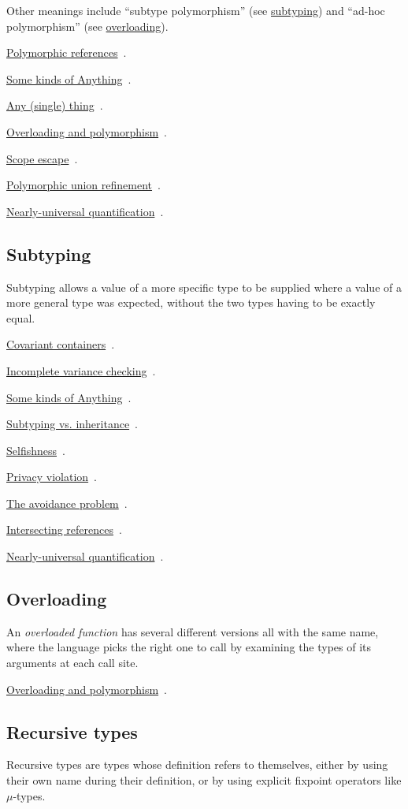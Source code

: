 \documentclass[11pt,oneside]{article}
\newenvironment{indexlist}
  {\par\vspace{0.3\baselineskip}\begingroup
   \setlength{\parindent}{0pt}\setlength{\parskip}{1pt}\small}
  {\endgroup\par\vspace{0.2\baselineskip}}
\newcommand{\indexitem}[2]{%
  \makebox[1.2em]{}\hyperref[#1]{#2}%
  \nobreak\hspace{0.4em}\textcolor{sageline}{\leaders\hbox{\,.\,}\hfill}%
  \hspace{0.4em}\nobreak\textcolor{stone}{\pageref{#1}}\par}
\begin{document}
Other meanings include ``subtype polymorphism'' (see \hyperref[gloss:subtyping]{subtyping}) and ``ad-hoc polymorphism'' (see \hyperref[gloss:overloading]{overloading}).

\begin{indexlist}
\indexitem{ce:polymorphic-references}{Polymorphic references}
\indexitem{ce:anythings}{Some kinds of Anything}
\indexitem{ce:anything-once}{Any (single) thing}
\indexitem{ce:overloading-polymorphism}{Overloading and polymorphism}
\indexitem{ce:scope-escape}{Scope escape}
\indexitem{ce:polymorphic-union-refinement}{Polymorphic union refinement}
\indexitem{ce:nearly-universal}{Nearly-universal quantification}
\end{indexlist}

\subsection*{Subtyping}\label{gloss:subtyping}
Subtyping allows a value of a more specific type to be supplied where a value of a more general type was expected, without the two types having to be exactly equal.

\begin{indexlist}
\indexitem{ce:general-covariance}{Covariant containers}
\indexitem{ce:incomplete-variance}{Incomplete variance checking}
\indexitem{ce:anythings}{Some kinds of Anything}
\indexitem{ce:subtyping-vs-inheritance}{Subtyping vs. inheritance}
\indexitem{ce:selfishness}{Selfishness}
\indexitem{ce:privacy-violation}{Privacy violation}
\indexitem{ce:avoidance}{The avoidance problem}
\indexitem{ce:intersecting-references}{Intersecting references}
\indexitem{ce:nearly-universal}{Nearly-universal quantification}
\end{indexlist}

\subsection*{Overloading}\label{gloss:overloading}
An \emph{overloaded function} has several different versions all with the same name, where the language picks the right one to call by examining the types of its arguments at each call site.

\begin{indexlist}
\indexitem{ce:overloading-polymorphism}{Overloading and polymorphism}
\end{indexlist}

\subsection*{Recursive types}\label{gloss:recursive-types}
Recursive types are types whose definition refers to themselves, either by using their own name during their definition, or by using explicit fixpoint operators like \(μ\)-types.
\end{document}
